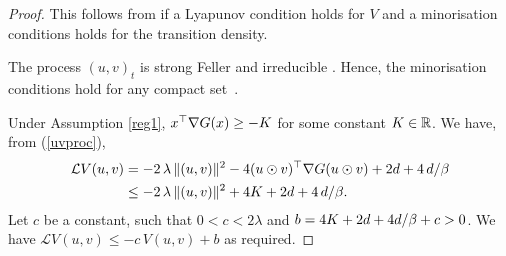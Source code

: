 \documentclass[11pt, twoside]{report}
\begin{document}
\begin{proof} This follows from \cite[Theorem 2.25]{Lelievre2016-hx} if  a Lyapunov condition holds for $V$  and a minorisation conditions holds for the transition density.

The process $(u,v)_t$ is strong Feller and irreducible \cite[Theorem 3.1]{2025hadalangsamp}. Hence,  the minorisation conditions hold for any compact set~\cite[Lemma 2.3]{mattingly2002ergodicity}. 

 Under Assumption \ref{reg1},  $x^\top \nabla G(x) \ge -K $ for some constant $K \in \mathbb{R}$.   We have, from (\ref{uvproc}),
    \begin{align*}
    \mathcal L V(u,v) 
    &= -2\,\lambda\,\|(u,v)\|^2  - 4(u \odot v)^\top \nabla G(u \odot v) + 2d+4\,d/\beta\\&
    \leq -2\,\lambda\,\|(u,v)\|^2  +4K+ 2d+4\,d/\beta.\end{align*}
    Let $c$ be a constant, such that $0 < c < 2\lambda$ and $b=4K+2d+4d/\beta  + c > 0$. We  have $\mathcal L V(u,v) \leq -c\,V(u,v) + b$ as required. 
\end{proof}
\end{document}
